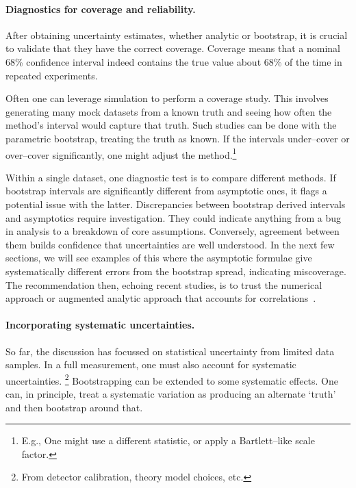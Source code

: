         \paragraph{Diagnostics for coverage and reliability.}
            After obtaining uncertainty estimates, whether analytic or bootstrap, it is crucial to validate that they have the correct coverage.
            Coverage means that a nominal 68\% confidence interval indeed contains the true value about 68\% of the time in repeated experiments.
            
            Often one can leverage simulation to perform a coverage study.
            This involves generating many mock datasets from a known truth and seeing how often the method's interval would capture that truth.
            Such studies can be done with the parametric bootstrap, treating the truth as known.
            If the intervals under--cover or over--cover significantly, one might adjust the method.\footnote{E.g., One might use a different statistic, or apply a Bartlett--like scale factor.}
            
            Within a single dataset, one diagnostic test is to compare different methods.
            If bootstrap intervals are significantly different from asymptotic ones, it flags a potential issue with the latter.
            Discrepancies between bootstrap derived intervals and asymptotics require investigation.
            They could indicate anything from a bug in analysis to a breakdown of core assumptions.
            Conversely, agreement between them builds confidence that uncertainties are well understood.
            In the next few sections, we will see examples of this where the asymptotic formulae give systematically different errors from the bootstrap spread, indicating miscoverage.
            The recommendation then, echoing recent studies, is to trust the numerical approach or augmented analytic approach that accounts for correlations~\cite{VanDenBroeck2006BinarySearches}.
            
        \paragraph{Incorporating systematic uncertainties.}
            So far, the discussion has focussed on statistical uncertainty from limited data samples.
            In a full measurement, one must also account for systematic uncertainties. \footnote{From detector calibration, theory model choices, etc.}
            Bootstrapping can be extended to some systematic effects.
            One can, in principle, treat a systematic variation as producing an alternate `truth' and then bootstrap around that.
            
